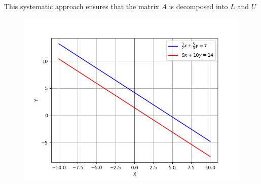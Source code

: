 \documentclass[journal]{IEEEtran}
\begin{document}
This systematic approach ensures that the matrix \( A \) is decomposed into \( L \) and \( U \) 
\begin{figure}[h!]
   \centering
   \includegraphics[width=\columnwidth]{figs/Figure_1.png}
\end{figure}
\end{document}
